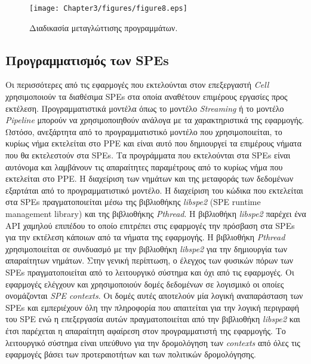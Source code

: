 \begin{figure}
\centering
\texttt{[image: Chapter3/figures/figure8.eps]}
\caption{Διαδικασία μεταγλώττισης προγραμμάτων.}
\label{figure:fig38}
\end{figure}

\subsection[3.3.2 Προγραμματισμός των SPEs]{Προγραμματισμός των SPEs}
\label{subsection:sub332}
\indent
Οι περισσότερες από τις εφαρμογές που εκτελούνται στον επεξεργαστή \textsl{Cell} χρησιμοποιούν τα διαθέσιμα \acp{SPE} στα οποία αναθέτουν επιμέρους εργασίες προς εκτέλεση. Προγραμματιστικά μοντέλα όπως το μοντέλο \textsl{Streaming} ή το μοντέλο \textsl{Pipeline} μπορούν να χρησιμοποιηθούν ανάλογα με τα χαρακτηριστικά της εφαρμογής. Ωστόσο, ανεξάρτητα από το προγραμματιστικό μοντέλο που χρησιμοποιείται, το κυρίως νήμα εκτελείται στο \ac{PPE} και είναι αυτό που δημιουργεί τα επιμέρους νήματα που θα εκτελεστούν στα \acp{SPE}. Τα προγράμματα που εκτελούνται στα \acp{SPE} είναι αυτόνομα και λαμβάνουν τις απαραίτητες παραμέτρους από το κυρίως νήμα που εκτελείται στο \ac{PPE}. Η διαχείριση των νημάτων και της μεταφοράς των δεδομένων εξαρτάται από το προγραμματιστικό μοντέλο.\newline \indent
Η διαχείριση του κώδικα που εκτελείται στα \acp{SPE} πραγματοποιείται μέσω της βιβλιοθήκης \textsl{libspe2} (SPE runtime management library) και της βιβλιοθήκης \textsl{Pthread}. Η βιβλιοθήκη \textsl{libspe2} παρέχει ένα \acf{API} χαμηλού επιπέδου το οποίο επιτρέπει στις εφαρμογές την πρόσβαση στα \acp{SPE} για την εκτέλεση κάποιων από τα νήματα της εφαρμογής. Η βιβλιοθήκη \textsl{Pthread} χρησιμοποιείται σε συνδυασμό με την βιβλιοθήκη \textsl{libspe2} για την δημιουργία των απαραίτητων νημάτων.\newline \indent
Στην γενική περίπτωση, ο έλεγχος των φυσικών πόρων των \acp{SPE} πραγματοποιείται από το λειτουργικό σύστημα και όχι από τις εφαρμογές. Οι εφαρμογές ελέγχουν και χρησιμοποιούν δομές δεδομένων σε λογισμικό οι οποίες ονομάζονται \textsl{SPE contexts}. Οι δομές αυτές αποτελούν μία λογική αναπαράσταση των \acp{SPE} και εμπεριέχουν όλη την πληροφορία που απαιτείται για την λογική περιγραφή του \ac{SPE} ενώ η επεξεργασία αυτών πραγματοποιείται από την βιβλιοθήκη \textsl{libspe2} και έτσι παρέχεται η απαραίτητη αφαίρεση στον προγραμματιστή της εφαρμογής. Το λειτουργικό σύστημα είναι υπεύθυνο για την δρομολόγηση των \textsl{contexts} από όλες τις εφαρμογές βάσει των προτεραιοτήτων και των πολιτικών δρομολόγησης.\newline \indent

